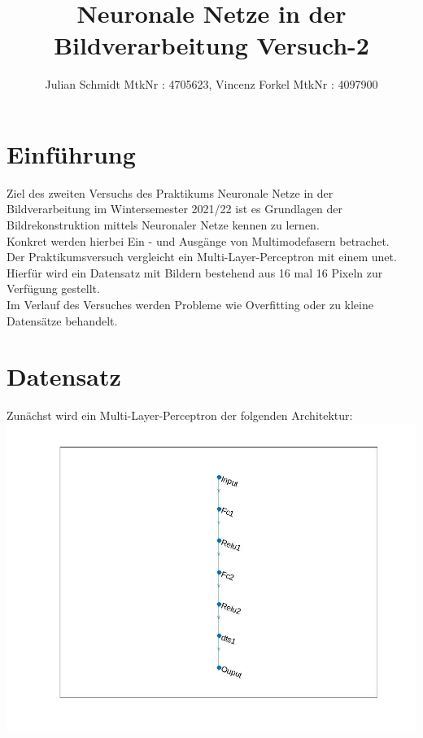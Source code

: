 \documentclass[8pt,a4paper]{article}
\title{Neuronale Netze in der Bildverarbeitung Versuch-2}
\author{Julian Schmidt MtkNr : 4705623, Vincenz Forkel MtkNr : 4097900}
\begin{document}
\maketitle

\section{Einführung}

Ziel des zweiten Versuchs des Praktikums Neuronale Netze in der Bildverarbeitung im Wintersemester 2021/22 ist es Grundlagen der Bildrekonstruktion mittels Neuronaler Netze kennen zu lernen.\\
Konkret werden hierbei Ein - und Ausgänge von Multimodefasern betrachet.\\
Der Praktikumsversuch vergleicht ein Multi-Layer-Perceptron mit einem unet.\\



Hierfür wird ein Datensatz mit Bildern bestehend aus 16 mal 16 Pixeln zur Verfügung gestellt.\\



Im Verlauf des Versuches werden Probleme wie Overfitting oder zu kleine Datensätze behandelt.
\newpage

\section{Datensatz}

Zunächst wird ein Multi-Layer-Perceptron der folgenden Architektur:\\

\includegraphics[scale=0.3]{layers.jpg}
\end{document}
